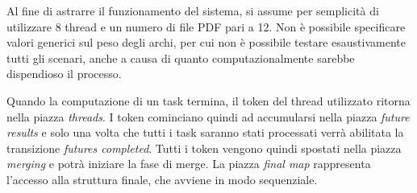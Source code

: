 \begin{warn}[NOTA:]
Al fine di astrarre il funzionamento del sistema, si assume per semplicità di utilizzare 8 thread e un numero di file PDF pari a 12. Non è possibile specificare valori generici sul peso degli archi, per cui non è possibile testare esaustivamente tutti gli scenari, anche a causa di quanto computazionalmente sarebbe dispendioso il processo.
\end{warn}
Quando la computazione di un task termina, il token del thread utilizzato ritorna nella piazza \textit{threads}.\newline
I token cominciano quindi ad accumularsi nella piazza \textit{future results} e solo una volta che tutti i task saranno stati processati verrà abilitata la transizione \textit{futures completed}.\newline
Tutti i token vengono quindi spostati nella piazza \textit{merging} e potrà iniziare la fase di merge.\newline
La piazza \textit{final map} rappresenta l'accesso alla struttura finale, che avviene in modo sequenziale.
